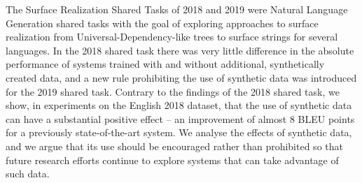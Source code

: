 The Surface Realization Shared Tasks of 2018 and 2019 were Natural Language Generation shared tasks with the goal of exploring approaches to surface realization from Universal-Dependency-like trees to surface strings for several languages. In the 2018 shared task there was very little difference in the absolute performance of systems trained with and without additional, synthetically created data, and a new rule prohibiting the use of synthetic data was introduced for the 2019 shared task. Contrary to the findings of the 2018 shared task, we show, in experiments on the English 2018 dataset, that the use of synthetic data can have a substantial positive effect -- an improvement of almost 8 BLEU points for a previously state-of-the-art system. We analyse the effects of synthetic data, and we argue that its use should be encouraged rather than prohibited so that future research efforts continue to explore systems that can take advantage of such data.
